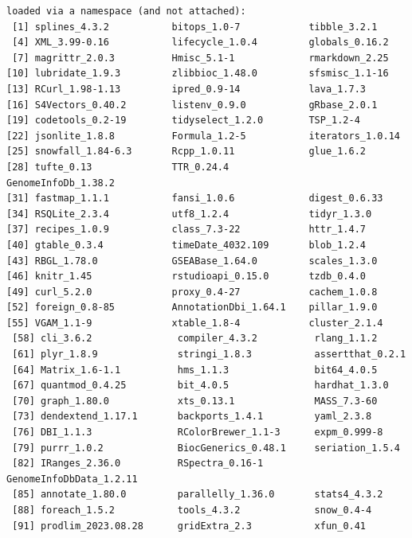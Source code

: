 \documentclass{amsart}
\begin{document}
\begin{verbatim}
loaded via a namespace (and not attached):
 [1] splines_4.3.2           bitops_1.0-7            tibble_3.2.1                              
 [4] XML_3.99-0.16           lifecycle_1.0.4         globals_0.16.2                            
 [7] magrittr_2.0.3          Hmisc_5.1-1             rmarkdown_2.25                        
[10] lubridate_1.9.3         zlibbioc_1.48.0         sfsmisc_1.1-16                                 
[13] RCurl_1.98-1.13         ipred_0.9-14            lava_1.7.3                               
[16] S4Vectors_0.40.2        listenv_0.9.0           gRbase_2.0.1                                
[19] codetools_0.2-19        tidyselect_1.2.0        TSP_1.2-4                                             
[22] jsonlite_1.8.8          Formula_1.2-5           iterators_1.0.14                     
[25] snowfall_1.84-6.3       Rcpp_1.0.11             glue_1.6.2                           
[28] tufte_0.13              TTR_0.24.4              GenomeInfoDb_1.38.2         
[31] fastmap_1.1.1           fansi_1.0.6             digest_0.6.33                  
[34] RSQLite_2.3.4           utf8_1.2.4              tidyr_1.3.0                  
[37] recipes_1.0.9           class_7.3-22            httr_1.4.7                      
[40] gtable_0.3.4            timeDate_4032.109       blob_1.2.4                     
[43] RBGL_1.78.0             GSEABase_1.64.0         scales_1.3.0                        
[46] knitr_1.45              rstudioapi_0.15.0       tzdb_0.4.0                         
[49] curl_5.2.0              proxy_0.4-27            cachem_1.0.8                     
[52] foreign_0.8-85          AnnotationDbi_1.64.1    pillar_1.9.0                        
[55] VGAM_1.1-9              xtable_1.8-4            cluster_2.1.4                       
 [58] cli_3.6.2               compiler_4.3.2          rlang_1.1.2                     
 [61] plyr_1.8.9              stringi_1.8.3           assertthat_0.2.1               
 [64] Matrix_1.6-1.1          hms_1.1.3               bit64_4.0.5                      
 [67] quantmod_0.4.25         bit_4.0.5               hardhat_1.3.0 
 [70] graph_1.80.0            xts_0.13.1              MASS_7.3-60 
 [73] dendextend_1.17.1       backports_1.4.1         yaml_2.3.8   
 [76] DBI_1.1.3               RColorBrewer_1.1-3      expm_0.999-8   
 [79] purrr_1.0.2             BiocGenerics_0.48.1     seriation_1.5.4 
 [82] IRanges_2.36.0          RSpectra_0.16-1         GenomeInfoDbData_1.2.11
 [85] annotate_1.80.0         parallelly_1.36.0       stats4_4.3.2 
 [88] foreach_1.5.2           tools_4.3.2             snow_0.4-4
 [91] prodlim_2023.08.28      gridExtra_2.3           xfun_0.41 

\end{verbatim}
\end{document}
